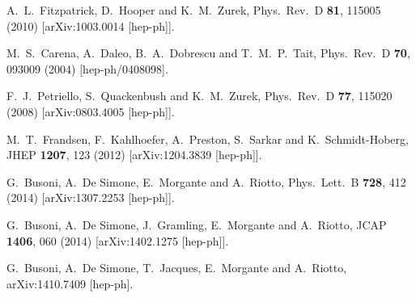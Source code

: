 \begin{thebibliography}{90}
  A.~L.~Fitzpatrick, D.~Hooper and K.~M.~Zurek,
  Phys.\ Rev.\ D {\bf 81}, 115005 (2010)
  [arXiv:1003.0014 [hep-ph]].


  M.~S.~Carena, A.~Daleo, B.~A.~Dobrescu and T.~M.~P.~Tait,
  Phys.\ Rev.\ D {\bf 70}, 093009 (2004)
  [hep-ph/0408098].
  
  

  F.~J.~Petriello, S.~Quackenbush and K.~M.~Zurek,
  Phys.\ Rev.\ D {\bf 77}, 115020 (2008)
  [arXiv:0803.4005 [hep-ph]].
  
  M.~T.~Frandsen, F.~Kahlhoefer, A.~Preston, S.~Sarkar and K.~Schmidt-Hoberg,
  JHEP {\bf 1207}, 123 (2012)
  [arXiv:1204.3839 [hep-ph]].

  G.~Busoni, A.~De Simone, E.~Morgante and A.~Riotto,
  Phys.\ Lett.\ B {\bf 728}, 412 (2014)
  [arXiv:1307.2253 [hep-ph]].
  
  G.~Busoni, A.~De Simone, J.~Gramling, E.~Morgante and A.~Riotto,
  JCAP {\bf 1406}, 060 (2014)
  [arXiv:1402.1275 [hep-ph]].
  
  G.~Busoni, A.~De Simone, T.~Jacques, E.~Morgante and A.~Riotto,
  arXiv:1410.7409 [hep-ph].
 

\end{thebibliography}
